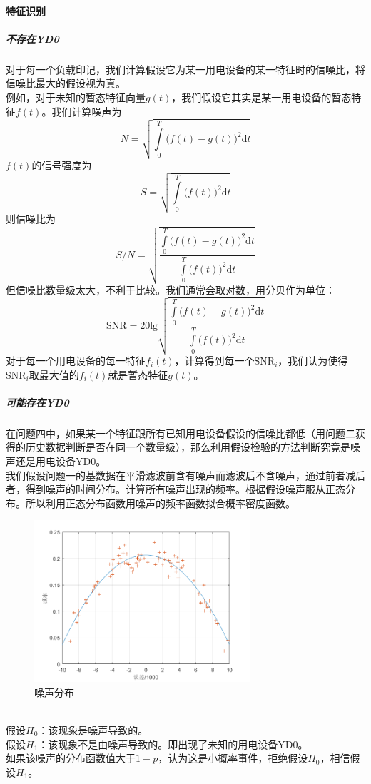 \documentclass[UTF8]{article}
\begin{document}
\paragraph{特征识别}
\subparagraph{不存在YD0}
\indent 对于每一个负载印记，我们计算假设它为某一用电设备的某一特征时的信噪比，将信噪比最大的假设视为真。\\
\indent 例如，对于未知的暂态特征向量\(g(t)\)，我们假设它其实是某一用电设备的暂态特征\(f(t)\)。我们计算噪声为
\[N=\sqrt{\int\limits_0^T\big(f(t)-g(t)\big)^2\textrm{d}t}\]
\indent \(f(t)\)的信号强度为
\[S=\sqrt{\int\limits_0^T\big(f(t)\big)^2\textrm{d}t}\]
\indent 则信噪比为
\[S/N=\sqrt{\frac{\int\limits_0^T\big(f(t)-g(t)\big)^2\textrm{d}t}{\int\limits_0^T\big(f(t)\big)^2\textrm{d}t}}\]
\indent 但信噪比数量级太大，不利于比较。我们通常会取对数，用分贝作为单位：
\[\textrm{SNR}=20\textrm{lg}\sqrt{\frac{\int\limits_0^T\big(f(t)-g(t)\big)^2\textrm{d}t}{\int\limits_0^T\big(f(t)\big)^2\textrm{d}t}}\]
\indent 对于每一个用电设备的每一特征\(f_i(t)\)，计算得到每一个SNR\(_i\)，我们认为使得SNR\(_i\)取最大值的\(f_i(t)\)就是暂态特征\(g(t)\)。

\subparagraph{可能存在YD0}
\indent 在问题四中，如果某一个特征跟所有已知用电设备假设的信噪比都低（用问题二获得的历史数据判断是否在同一个数量级），那么利用假设检验的方法判断究竟是噪声还是用电设备YD0。\\
\indent 我们假设问题一的基数据在平滑滤波前含有噪声而滤波后不含噪声，通过前者减后者，得到噪声的时间分布。计算所有噪声出现的频率。根据假设噪声服从正态分布。所以利用正态分布函数用噪声的频率函数拟合概率密度函数。
\begin{figure}[htbp]
\small
\centering
\includegraphics[width=8cm]{N.png}
\caption{噪声分布}
\end{figure}\\
\indent 假设\(H_0\)：该现象是噪声导致的。\\
\indent 假设\(H_1\)：该现象不是由噪声导致的。即出现了未知的用电设备YD0。\\
\indent 如果该噪声的分布函数值大于\(1-p\)，认为这是小概率事件，拒绝假设\(H_0\)，相信假设\(H_1\)。\\
\end{document}
